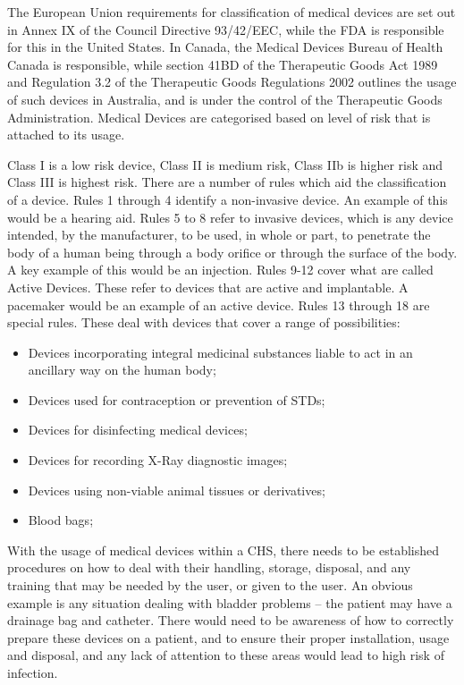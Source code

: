 The European Union requirements for classification of medical devices are set out in Annex IX of the Council Directive 93/42/EEC, while the FDA is responsible for this in the United States. In Canada, the Medical Devices Bureau of Health Canada is responsible, while section 41BD of the Therapeutic Goods Act 1989 and Regulation 3.2 of the Therapeutic Goods Regulations 2002 outlines the usage of such devices in Australia, and is under the control of the Therapeutic Goods Administration. Medical Devices are categorised based on level of risk that is attached to its usage. 

Class I is a low risk device, Class II is medium risk, Class IIb is higher risk and Class III is highest risk. There are a number of rules which aid the classification of a device. Rules 1 through 4 identify a non-invasive device. An example of this would be a hearing aid. Rules 5 to 8 refer to invasive devices, which is any device intended, by the manufacturer, to be used, in whole or part, to penetrate the body of a human being through a body orifice or through the surface of the body. A key example of this would be an injection. Rules 9-12 cover what are called Active Devices. These refer to devices that are active and implantable. A pacemaker would be an example of an active device. Rules 13 through 18 are special rules. These deal with devices that cover a range of possibilities:

\begin{itemize}
\item Devices incorporating integral medicinal substances liable to act in an ancillary way on the human body;
\item Devices used for contraception or prevention of STDs;
\item Devices for disinfecting medical devices;
\item Devices for recording X-Ray diagnostic images;
\item Devices using non-viable animal tissues or derivatives;
\item Blood bags;
\end{itemize}

With the usage of medical devices within a CHS, there needs to be established procedures on how to deal with their handling, storage, disposal, and any training that may be needed by the user, or given to the user. An obvious example is any situation dealing with bladder problems – the patient may have a drainage bag and catheter. There would need to be awareness of how to correctly prepare these devices on a patient, and to ensure their proper installation, usage and disposal, and any lack of attention to these areas would lead to high risk of infection.

